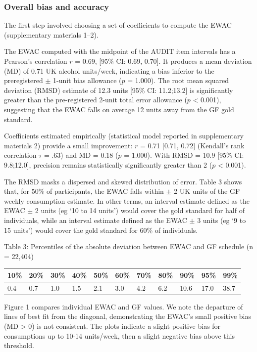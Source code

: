 \documentclass[]{article}
\begin{document}
\hypertarget{overall-bias-and-accuracy}{%
\subsubsection{Overall bias and
accuracy}\label{overall-bias-and-accuracy}}

The first step involved choosing a set of coefficients to compute the
EWAC (supplementary materials 1--2).

The EWAC computed with the midpoint of the AUDIT item intervals has a
Pearson's correlation \(r\) = 0.69, {[}95\% CI: 0.69, 0.70{]}. It
produces a mean deviation (MD) of 0.71 UK alcohol units/week, indicating
a bias inferior to the preregistered \(\pm\) 1-unit bias allowance
(\(p\) = 1.000). The root mean squared deviation (RMSD) estimate of 12.3
units {[}95\% CI: 11.2;13.2{]} is significantly greater than the
pre-registered 2-unit total error allowance (\(p\) \textless{} 0.001),
suggesting that the EWAC falls on average 12 units away from the GF gold
standard.

Coefficients estimated empirically (statistical model reported in
supplementary materials 2) provide a small improvement: \(r\) = 0.71
{[}0.71, 0.72{]} (Kendall's rank correlation \(\tau\) = .63) and MD =
0.18 (\(p\) = 1.000). With RMSD = 10.9 {[}95\% CI: 9.8;12.0{]},
precision remains statistically significantly greater than 2 (\(p\)
\textless{} 0.001).

The RMSD masks a dispersed and skewed distribution of error. Table 3
shows that, for 50\% of participants, the EWAC falls within \(\pm\) 2 UK
units of the GF weekly consumption estimate. In other terms, an interval
estimate defined as the EWAC \(\pm\) 2 units (eg `10 to 14 units') would
cover the gold standard for half of individuals, while an interval
estimate defined as the EWAC \(\pm\) 3 units (eg `9 to 15 units') would
cover the gold standard for 60\% of individuals.

Table 3: Percentiles of the absolute deviation between EWAC and GF
schedule (n = 22,404)

\begin{tabular}{l|l|l|l|l|l|l|l|l|l|l}
\hline
10\% & 20\% & 30\% & 40\% & 50\% & 60\% & 70\% & 80\% & 90\% & 95\% & 99\%\\
\hline
0.4 & 0.7 & 1.0 & 1.5 & 2.1 & 3.0 & 4.2 & 6.2 & 10.6 & 17.0 & 38.7\\
\hline
\end{tabular}

Figure 1 compares individual EWAC and GF values. We note the departure
of lines of best fit from the diagonal, demonstrating the EWAC's small
positive bias (MD \textgreater{} 0) is not consistent. The plots
indicate a slight positive bias for consumptions up to 10-14 units/week,
then a slight negative bias above this threshold.
\end{document}
